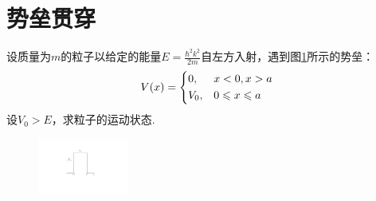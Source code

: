 \section[势垒贯穿]{势垒贯穿} \label{sec:02.06} %

设质量为$m$的粒子以给定的能量$E=\frac{\hbar^{2}k^{2}}{2m}$自左方入射，遇到图\ref{fig.2-9}所示的势垒：
\begin{equation}\label{eq26.1}
	V(x)=
	\begin{dcases}
		0, 		& x<0,x>a	\\
		V_{0},  & 0\leqslant x \leqslant a
	\end{dcases}
\end{equation}
设$V_{0}>E$，求粒子的运动状态.

\begin{figure}
	\includegraphics[width=3cm]{QM file/figure/2-9}
	\caption{}\label{fig.2-9}
\end{figure}

